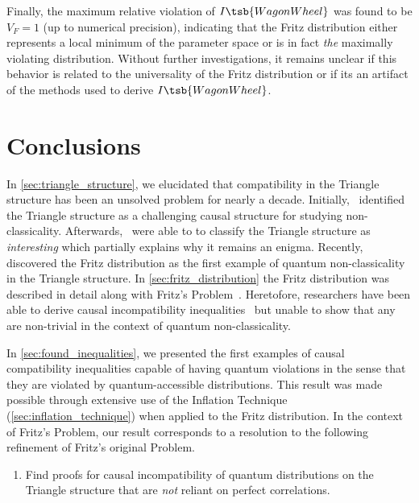 \documentclass[aps, 10pt, english, twoside, pra, nofootinbib, tightenlines, longbibliography, superscriptaddress]{revtex4-1}
\begin{document}
    Finally, the maximum relative violation of $I\tsb{WagonWheel}$ was found to be $V_F = 1$ (up to numerical precision), indicating that the Fritz distribution either represents a local minimum of the parameter space or is in fact \textit{the} maximally violating distribution. Without further investigations, it remains unclear if this behavior is related to the universality of the Fritz distribution or if its an artifact of the methods used to derive $I\tsb{WagonWheel}$.

    \section{Conclusions}
    \label{sec:conclusions}
    In \cref{sec:triangle_structure}, we elucidated that compatibility in the Triangle structure has been an unsolved problem for nearly a decade. Initially,~\citet{Branciard_2012} identified the Triangle structure as a challenging causal structure for studying non-classicality. Afterwards,~\citet{Henson_2014} were able to to classify the Triangle structure as \textit{interesting} which partially explains why it remains an enigma. Recently,~\citet{Fritz_2012} discovered the Fritz distribution as the first example of quantum non-classicality in the Triangle structure. In \cref{sec:fritz_distribution} the Fritz distribution was described in detail along with Fritz's Problem~\cite[Problem 2.17]{Fritz_2012}. Heretofore, researchers have been able to derive causal incompatibility inequalities~\cite{Inflation,Steudel_2010,Henson_2014} but unable to show that any are non-trivial in the context of quantum non-classicality.

    In \cref{sec:found_inequalities}, we presented the first examples of causal compatibility inequalities capable of having quantum violations in the sense that they are violated by quantum-accessible distributions. This result was made possible through extensive use of the Inflation Technique (\cref{sec:inflation_technique}) when applied to the Fritz distribution. In the context of Fritz's Problem, our result corresponds to a resolution to the following refinement of Fritz's original Problem.
    \begin{enumerate}[label=\textbf{R.\arabic*}]
        \setcounter{enumi}{0}
        \item \label{r:1} Find proofs for causal incompatibility of quantum distributions on the Triangle structure that are \textit{not} reliant on perfect correlations.
    \end{enumerate}
\end{document}
